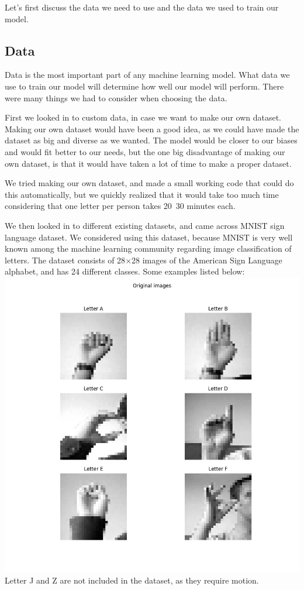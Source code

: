 \documentclass[../paper.tex]{subfiles}
\begin{document}
    Let's first discuss the data we need to use and the data we used to train our model.
    \subsection{Data}
    Data is the most important part of any machine learning model.
    What data we use to train our model will determine how well our model will perform. 
    There were many things we had to consider when choosing the data. 

    First we looked in to custom data, in case we want to make our own dataset. 
    Making our own dataset would have been a good idea, 
    as we could have made the dataset as big and diverse as we wanted.
    The model would be closer to our biases and would fit better to our needs, 
    but the one big disadvantage of making our own dataset, is that it would have taken a lot of time to make a proper dataset. 

    We tried making our own dataset, and made a small working code that could do this automatically, 
    but we quickly realized that it would take too much time considering that one letter per person takes 20~30 minutes each. 

    We then looked in to different existing datasets, and came across MNIST sign language dataset\cite{d0}. 
    We considered using this dataset, because MNIST is very well known among the machine learning community regarding image classification of letters\cite{o0}.
    The dataset consists of 28$\times$28 images of the American Sign Language alphabet, 
    and has 24 different classes. 
    Some examples listed below:
    \includegraphics[width=\linewidth]{letters_grid_6} 
    Letter J and Z are not included in the dataset, as they require motion. 
\end{document}
